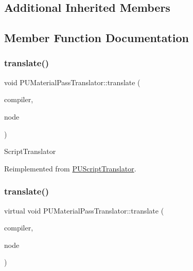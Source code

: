 \subsection*{Additional Inherited Members}


\subsection{Member Function Documentation}
\mbox{\label{classPUMaterialPassTranslator_a712a3e8bd5191c11f8bacd7c1e1e790a}} 
\subsubsection{\texorpdfstring{translate()}{translate()}\hspace{0.1cm}{\footnotesize\ttfamily [1/2]}}
{\footnotesize\ttfamily void P\+U\+Material\+Pass\+Translator\+::translate (\begin{DoxyParamCaption}\item[{\hyperlink{classPUScriptCompiler}{P\+U\+Script\+Compiler} $\ast$}]{compiler,  }\item[{\hyperlink{classPUAbstractNode}{P\+U\+Abstract\+Node} $\ast$}]{node }\end{DoxyParamCaption})\hspace{0.3cm}{\ttfamily [virtual]}}

Script\+Translator 

Reimplemented from \hyperlink{classPUScriptTranslator_a9ff2cdfda9ea8db6fd716e7b69dbe79b}{P\+U\+Script\+Translator}.

\mbox{\label{classPUMaterialPassTranslator_a8da82728ce6e1aa0c1a57b70e19b1c2b}} 
\subsubsection{\texorpdfstring{translate()}{translate()}\hspace{0.1cm}{\footnotesize\ttfamily [2/2]}}
{\footnotesize\ttfamily virtual void P\+U\+Material\+Pass\+Translator\+::translate (\begin{DoxyParamCaption}\item[{\hyperlink{classPUScriptCompiler}{P\+U\+Script\+Compiler} $\ast$}]{compiler,  }\item[{\hyperlink{classPUAbstractNode}{P\+U\+Abstract\+Node} $\ast$}]{node }\end{DoxyParamCaption})\hspace{0.3cm}{\ttfamily [virtual]}}

